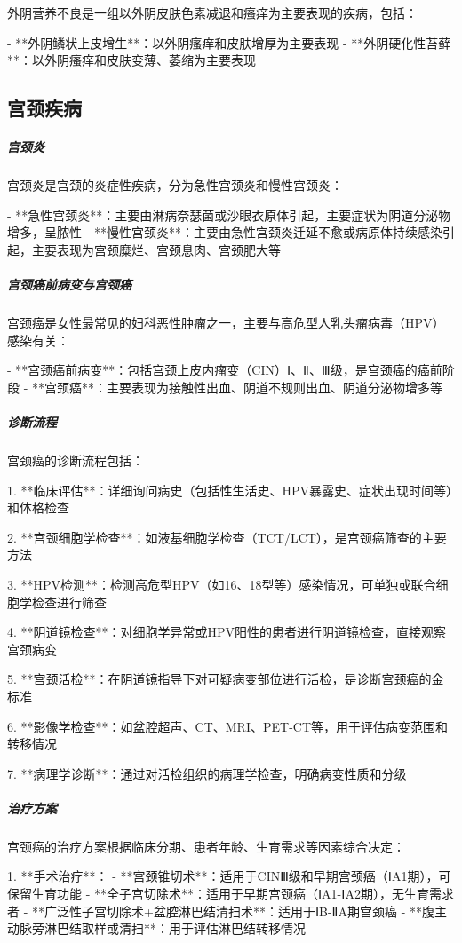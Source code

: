 \begin{enumerate}
外阴营养不良是一组以外阴皮肤色素减退和瘙痒为主要表现的疾病，包括：

- **外阴鳞状上皮增生**：以外阴瘙痒和皮肤增厚为主要表现
- **外阴硬化性苔藓**：以外阴瘙痒和皮肤变薄、萎缩为主要表现

\subsection{宫颈疾病}

\subparagraph{宫颈炎}

宫颈炎是宫颈的炎症性疾病，分为急性宫颈炎和慢性宫颈炎：

- **急性宫颈炎**：主要由淋病奈瑟菌或沙眼衣原体引起，主要症状为阴道分泌物增多，呈脓性
- **慢性宫颈炎**：主要由急性宫颈炎迁延不愈或病原体持续感染引起，主要表现为宫颈糜烂、宫颈息肉、宫颈肥大等

\subparagraph{宫颈癌前病变与宫颈癌}

宫颈癌是女性最常见的妇科恶性肿瘤之一，主要与高危型人乳头瘤病毒（HPV）感染有关：

- **宫颈癌前病变**：包括宫颈上皮内瘤变（CIN）Ⅰ、Ⅱ、Ⅲ级，是宫颈癌的癌前阶段
- **宫颈癌**：主要表现为接触性出血、阴道不规则出血、阴道分泌物增多等

\subparagraph{诊断流程}

宫颈癌的诊断流程包括：

1. **临床评估**：详细询问病史（包括性生活史、HPV暴露史、症状出现时间等）和体格检查

2. **宫颈细胞学检查**：如液基细胞学检查（TCT/LCT），是宫颈癌筛查的主要方法

3. **HPV检测**：检测高危型HPV（如16、18型等）感染情况，可单独或联合细胞学检查进行筛查

4. **阴道镜检查**：对细胞学异常或HPV阳性的患者进行阴道镜检查，直接观察宫颈病变

5. **宫颈活检**：在阴道镜指导下对可疑病变部位进行活检，是诊断宫颈癌的金标准

6. **影像学检查**：如盆腔超声、CT、MRI、PET-CT等，用于评估病变范围和转移情况

7. **病理学诊断**：通过对活检组织的病理学检查，明确病变性质和分级

\subparagraph{治疗方案}

宫颈癌的治疗方案根据临床分期、患者年龄、生育需求等因素综合决定：

1. **手术治疗**：
   - **宫颈锥切术**：适用于CINⅢ级和早期宫颈癌（ⅠA1期），可保留生育功能
   - **全子宫切除术**：适用于早期宫颈癌（ⅠA1-ⅠA2期），无生育需求者
   - **广泛性子宫切除术+盆腔淋巴结清扫术**：适用于ⅠB-ⅡA期宫颈癌
   - **腹主动脉旁淋巴结取样或清扫**：用于评估淋巴结转移情况


\end{enumerate}
